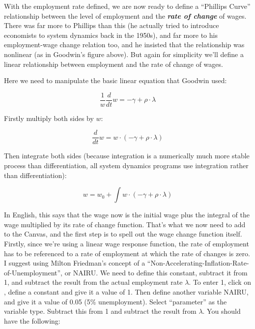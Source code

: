 With the employment rate defined, we are now ready to define a
``Phillips Curve'' relationship between the level of employment and the
{\em\bf rate of change} of wages. There was far more to Phillips than this (he
actually tried to introduce economists to system dynamics back in the
1950s), and far more to his employment-wage change relation too, and
he insisted that the relationship was nonlinear (as in Goodwin's
figure above). But again for simplicity we'll define a linear
relationship between employment and the rate of change of wages. 

Here we need to manipulate the basic linear equation that Goodwin used:

\begin{displaymath}
\frac1w\frac d{dt}w = -\gamma+\rho\cdot\lambda
\end{displaymath}

Firstly multiply both sides by $w$:

\begin{displaymath}
\frac d{dt}w = w\cdot(-\gamma+\rho\cdot\lambda)
\end{displaymath}

Then integrate both sides (because integration is a numerically much
more stable process than differentiation, all system dynamics programs
use integration rather than differentiation): 

\begin{displaymath}
w=w_0+\int w\cdot(-\gamma+\rho\cdot\lambda)
\end{displaymath}

In English, this says that the wage now is the initial wage plus the
integral of the wage multiplied by its rate of change function. That's
what we now need to add to the Canvas, and the first step is to spell
out the wage change function itself. Firstly, since we're using a
linear wage response function, the rate of employment has to be
referenced to a rate of employment at which the rate of changes is
zero.  I suggest using Milton Friedman's concept of a
``Non-Accelerating-Inflation-Rate-of-Unemployment'', or NAIRU. We need
to define this constant, subtract it from 1, and subtract the result
from the actual employment rate $\lambda$. To enter 1, click on
, define a constant and give it
a value of 1. Then define another variable NAIRU, and give it a value
of 0.05 (5\% unemployment). Select ``parameter'' as the variable
type. Subtract this from 1 and subtract the result from $\lambda$. You
should have the following:

